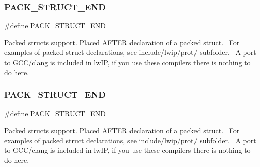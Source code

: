 \subsubsection{\texorpdfstring{P\+A\+C\+K\+\_\+\+S\+T\+R\+U\+C\+T\+\_\+\+E\+ND}{PACK\_STRUCT\_END}\hspace{0.1cm}{\footnotesize\ttfamily [1/2]}}
{\footnotesize\ttfamily \#define P\+A\+C\+K\+\_\+\+S\+T\+R\+U\+C\+T\+\_\+\+E\+ND}

Packed structs support. Placed A\+F\+T\+ER declaration of a packed struct.~\newline
For examples of packed struct declarations, see include/lwip/prot/ subfolder.~\newline
A port to G\+C\+C/clang is included in lw\+IP, if you use these compilers there is nothing to do here. \mbox{\label{group__compiler__abstraction_ga465fef70f294e21cbf4ea51fc342f20e}} 
\subsubsection{\texorpdfstring{P\+A\+C\+K\+\_\+\+S\+T\+R\+U\+C\+T\+\_\+\+E\+ND}{PACK\_STRUCT\_END}\hspace{0.1cm}{\footnotesize\ttfamily [2/2]}}
{\footnotesize\ttfamily \#define P\+A\+C\+K\+\_\+\+S\+T\+R\+U\+C\+T\+\_\+\+E\+ND}

Packed structs support. Placed A\+F\+T\+ER declaration of a packed struct.~\newline
For examples of packed struct declarations, see include/lwip/prot/ subfolder.~\newline
A port to G\+C\+C/clang is included in lw\+IP, if you use these compilers there is nothing to do here. \mbox{\label{group__compiler__abstraction_gaab0b988124e37a978d9a88e7c1c778e0}} 
